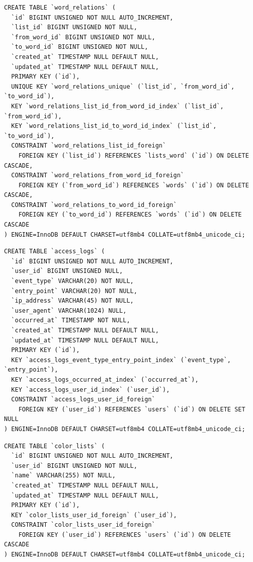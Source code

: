 \documentclass{thesis-ekf}
\begin{document}
\begin{lstlisting}[style=mysqlstyle]
CREATE TABLE `word_relations` (
  `id` BIGINT UNSIGNED NOT NULL AUTO_INCREMENT,
  `list_id` BIGINT UNSIGNED NOT NULL,
  `from_word_id` BIGINT UNSIGNED NOT NULL,
  `to_word_id` BIGINT UNSIGNED NOT NULL,
  `created_at` TIMESTAMP NULL DEFAULT NULL,
  `updated_at` TIMESTAMP NULL DEFAULT NULL,
  PRIMARY KEY (`id`),
  UNIQUE KEY `word_relations_unique` (`list_id`, `from_word_id`, `to_word_id`),
  KEY `word_relations_list_id_from_word_id_index` (`list_id`, `from_word_id`),
  KEY `word_relations_list_id_to_word_id_index` (`list_id`, `to_word_id`),
  CONSTRAINT `word_relations_list_id_foreign`
    FOREIGN KEY (`list_id`) REFERENCES `lists_word` (`id`) ON DELETE CASCADE,
  CONSTRAINT `word_relations_from_word_id_foreign`
    FOREIGN KEY (`from_word_id`) REFERENCES `words` (`id`) ON DELETE CASCADE,
  CONSTRAINT `word_relations_to_word_id_foreign`
    FOREIGN KEY (`to_word_id`) REFERENCES `words` (`id`) ON DELETE CASCADE
) ENGINE=InnoDB DEFAULT CHARSET=utf8mb4 COLLATE=utf8mb4_unicode_ci;
\end{lstlisting}

\begin{lstlisting}[style=mysqlstyle]
CREATE TABLE `access_logs` (
  `id` BIGINT UNSIGNED NOT NULL AUTO_INCREMENT,
  `user_id` BIGINT UNSIGNED NULL,
  `event_type` VARCHAR(20) NOT NULL,
  `entry_point` VARCHAR(20) NOT NULL,
  `ip_address` VARCHAR(45) NOT NULL,
  `user_agent` VARCHAR(1024) NULL,
  `occurred_at` TIMESTAMP NOT NULL,
  `created_at` TIMESTAMP NULL DEFAULT NULL,
  `updated_at` TIMESTAMP NULL DEFAULT NULL,
  PRIMARY KEY (`id`),
  KEY `access_logs_event_type_entry_point_index` (`event_type`, `entry_point`),
  KEY `access_logs_occurred_at_index` (`occurred_at`),
  KEY `access_logs_user_id_index` (`user_id`),
  CONSTRAINT `access_logs_user_id_foreign`
    FOREIGN KEY (`user_id`) REFERENCES `users` (`id`) ON DELETE SET NULL
) ENGINE=InnoDB DEFAULT CHARSET=utf8mb4 COLLATE=utf8mb4_unicode_ci;
\end{lstlisting}

\begin{lstlisting}[style=mysqlstyle]
CREATE TABLE `color_lists` (
  `id` BIGINT UNSIGNED NOT NULL AUTO_INCREMENT,
  `user_id` BIGINT UNSIGNED NOT NULL,
  `name` VARCHAR(255) NOT NULL,
  `created_at` TIMESTAMP NULL DEFAULT NULL,
  `updated_at` TIMESTAMP NULL DEFAULT NULL,
  PRIMARY KEY (`id`),
  KEY `color_lists_user_id_foreign` (`user_id`),
  CONSTRAINT `color_lists_user_id_foreign`
    FOREIGN KEY (`user_id`) REFERENCES `users` (`id`) ON DELETE CASCADE
) ENGINE=InnoDB DEFAULT CHARSET=utf8mb4 COLLATE=utf8mb4_unicode_ci;
\end{lstlisting}
\end{document}
